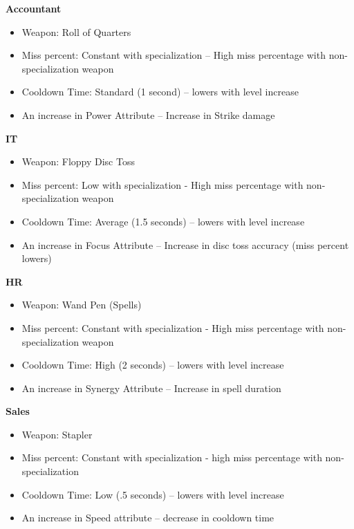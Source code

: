 \documentclass[12pt]{report}
\begin{document}
\textbf{\large{Accountant}}
\begin{itemize}
  \item Weapon: Roll of Quarters
  \item Miss percent: Constant with specialization -- High miss percentage with non-specialization weapon
  \item Cooldown Time: Standard (1 second) -- lowers with level increase %
  \item An increase in Power Attribute -- Increase in Strike damage \\
\end{itemize}

\textbf{\large{IT}} 
\begin{itemize}
  \item Weapon: Floppy Disc Toss
  \item Miss percent: Low with specialization - High miss percentage with non-specialization weapon
  \item Cooldown Time: Average (1.5 seconds) -- lowers with level increase
  \item An increase in Focus Attribute -- Increase in disc toss accuracy (miss percent lowers)\\
\end{itemize}

\textbf{\large{HR}}
\begin{itemize}
  \item Weapon: Wand Pen (Spells)
  \item Miss percent: Constant with specialization - High miss percentage with non-specialization weapon
  \item Cooldown Time: High (2 seconds) -- lowers with level increase
  \item An increase in Synergy Attribute -- Increase in spell duration\\
\end{itemize}

\textbf{\large{Sales}}
\begin{itemize}
  \item Weapon: Stapler
  \item Miss percent: Constant with specialization - high miss percentage with non-specialization 
  \item Cooldown Time: Low (.5 seconds) -- lowers with level increase
  \item An increase in Speed attribute -- decrease in cooldown time
\end{itemize}
\end{document}
